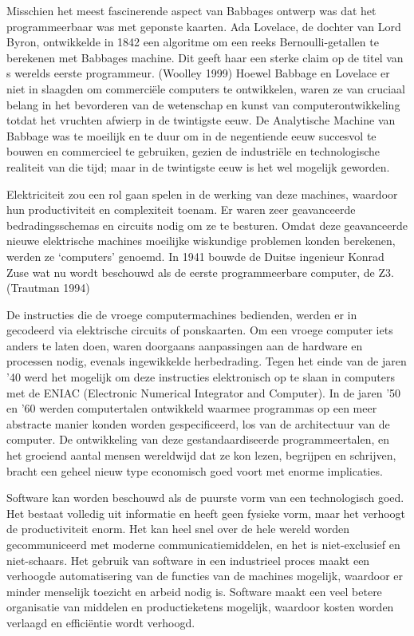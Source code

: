 \documentclass[
  a5paper,
  smalldemyvopaper,11pt,twoside,onecolumn,openright,extrafontsizes,
hidelinks]{memoir}
\begin{document}
Misschien het meest fascinerende aspect van Babbages ontwerp was dat het
programmeerbaar was met geponste kaarten. Ada Lovelace, de dochter van
Lord Byron, ontwikkelde in 1842 een algoritme om een reeks
Bernoulli-getallen te berekenen met Babbages machine. Dit geeft haar een
sterke claim op de titel van s werelds eerste programmeur. (Woolley
1999) Hoewel Babbage en Lovelace er niet in slaagden om commerciële
computers te ontwikkelen, waren ze van cruciaal belang in het bevorderen
van de wetenschap en kunst van computerontwikkeling totdat het vruchten
afwierp in de twintigste eeuw. De Analytische Machine van Babbage was te
moeilijk en te duur om in de negentiende eeuw succesvol te bouwen en
commercieel te gebruiken, gezien de industriële en technologische
realiteit van die tijd; maar in de twintigste eeuw is het wel mogelijk
geworden.

Elektriciteit zou een rol gaan spelen in de werking van deze machines,
waardoor hun productiviteit en complexiteit toenam. Er waren zeer
geavanceerde bedradingsschemas en circuits nodig om ze te besturen.
Omdat deze geavanceerde nieuwe elektrische machines moeilijke wiskundige
problemen konden berekenen, werden ze `computers' genoemd. In 1941
bouwde de Duitse ingenieur Konrad Zuse wat nu wordt beschouwd als de
eerste programmeerbare computer, de Z3. (Trautman 1994)

De instructies die de vroege computermachines bedienden, werden er in
gecodeerd via elektrische circuits of ponskaarten. Om een vroege
computer iets anders te laten doen, waren doorgaans aanpassingen aan de
hardware en processen nodig, evenals ingewikkelde herbedrading. Tegen
het einde van de jaren '40 werd het mogelijk om deze instructies
elektronisch op te slaan in computers met de ENIAC (Electronic Numerical
Integrator and Computer). In de jaren '50 en '60 werden computertalen
ontwikkeld waarmee programmas op een meer abstracte manier konden worden
gespecificeerd, los van de architectuur van de computer. De ontwikkeling
van deze gestandaardiseerde programmeertalen, en het groeiend aantal
mensen wereldwijd dat ze kon lezen, begrijpen en schrijven, bracht een
geheel nieuw type economisch goed voort met enorme implicaties.

Software kan worden beschouwd als de puurste vorm van een technologisch
goed. Het bestaat volledig uit informatie en heeft geen fysieke vorm,
maar het verhoogt de productiviteit enorm. Het kan heel snel over de
hele wereld worden gecommuniceerd met moderne communicatiemiddelen, en
het is niet-exclusief en niet-schaars. Het gebruik van software in een
industrieel proces maakt een verhoogde automatisering van de functies
van de machines mogelijk, waardoor er minder menselijk toezicht en
arbeid nodig is. Software maakt een veel betere organisatie van middelen
en productieketens mogelijk, waardoor kosten worden verlaagd en
efficiëntie wordt verhoogd.
\end{document}
